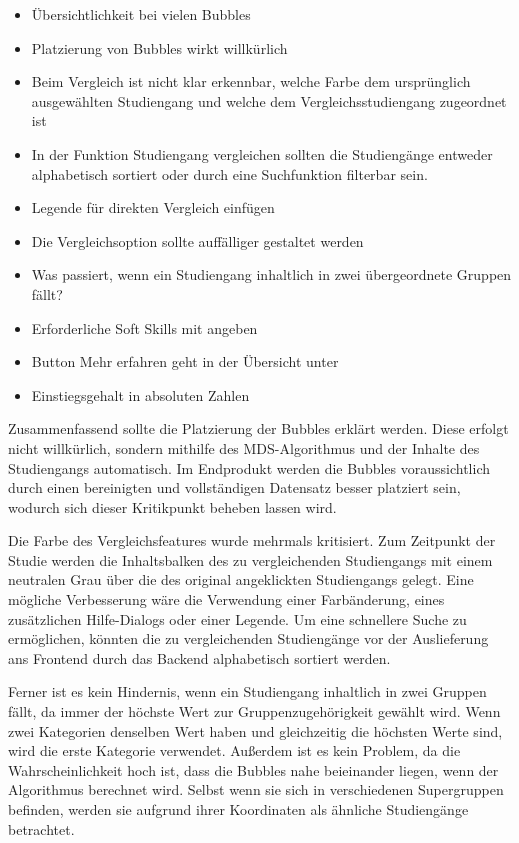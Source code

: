 \begin{itemize}
    \item Übersichtlichkeit bei vielen Bubbles
    \item Platzierung von Bubbles wirkt willkürlich
    \item Beim Vergleich ist nicht klar erkennbar, welche Farbe dem ursprünglich ausgewählten Studiengang und welche dem Vergleichsstudiengang zugeordnet ist
    \item In der Funktion \glqq Studiengang vergleichen\grqq{} sollten die Studiengänge entweder alphabetisch sortiert oder durch eine Suchfunktion filterbar sein.
    \item Legende für direkten Vergleich einfügen
    \item Die Vergleichsoption sollte auffälliger gestaltet werden
    \item Was passiert, wenn ein Studiengang inhaltlich in zwei übergeordnete Gruppen fällt?
    \item Erforderliche Soft Skills mit angeben
    \item Button \glqq Mehr erfahren\grqq{} geht in der Übersicht unter
    \item Einstiegsgehalt in absoluten Zahlen
\end{itemize}

Zusammenfassend sollte die Platzierung der Bubbles erklärt werden. Diese erfolgt nicht willkürlich, sondern mithilfe des MDS-Algorithmus und der Inhalte des Studiengangs automatisch. Im Endprodukt werden die Bubbles voraussichtlich durch einen bereinigten und vollständigen Datensatz besser platziert sein, wodurch sich dieser Kritikpunkt beheben lassen wird.

Die Farbe des Vergleichsfeatures wurde mehrmals kritisiert. Zum Zeitpunkt der Studie werden die Inhaltsbalken des zu vergleichenden Studiengangs mit einem neutralen Grau über die des original angeklickten Studiengangs gelegt. Eine mögliche Verbesserung wäre die Verwendung einer Farbänderung, eines zusätzlichen Hilfe-Dialogs oder einer Legende. Um eine schnellere Suche zu ermöglichen, könnten die zu vergleichenden Studiengänge vor der Auslieferung ans Frontend durch das Backend alphabetisch sortiert werden.

Ferner ist es kein Hindernis, wenn ein Studiengang inhaltlich in zwei Gruppen fällt, da immer der höchste Wert zur Gruppenzugehörigkeit gewählt wird. Wenn zwei Kategorien denselben Wert haben und gleichzeitig die höchsten Werte sind, wird die erste Kategorie verwendet. Außerdem ist es kein Problem, da die Wahrscheinlichkeit hoch ist, dass die Bubbles nahe beieinander liegen, wenn der Algorithmus berechnet wird. Selbst wenn sie sich in verschiedenen Supergruppen befinden, werden sie aufgrund ihrer Koordinaten als ähnliche Studiengänge betrachtet.


